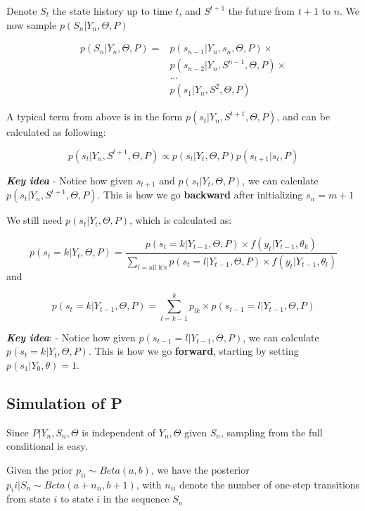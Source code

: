 \documentclass{article}
\begin{document}
Denote $S_t$ the state history up to time $t$, and $S^{t+1}$ the future
from $t+1$ to $n$. We now sample $p(S_n | Y_n, \Theta, P)$

\begin{align}
p(S_n | Y_n, \Theta, P) =
& p(s_{n-1} | Y_n, s_n, \Theta, P) \times \\
& p(s_{n-2} | Y_n, S^{n-1}, \Theta, P) \times  \\
& \dots \\
& p(s_1 | Y_n, S^2, \Theta, P)
\end{align}

A typical term from above is in the form
$p(s_t | Y_n, S^{t+1}, \Theta, P)$, and can be calculated as following:

\begin{equation}
p(s_t | Y_n, S^{t+1}, \Theta, P) \propto p(s_t | Y_t, \Theta, P) p(s_{t+1}|s_t, P)
\end{equation}

\textbf{\emph{Key idea}} - Notice how given $s_{t+1}$ and
$p(s_t | Y_t, \Theta, P)$, we can calculate
$p(s_t | Y_n, S^{t+1}, \Theta, P)$. This is how we go \textbf{backward}
after initializing $s_n = m + 1$

We still need $p(s_t | Y_t, \Theta, P)$, which is calculated as:

\[
p(s_t = k | Y_t, \Theta, P) = \frac{p(s_t = k | Y_{t-1}, \Theta, P) \times f(y_t | Y_{t-1}, \theta_k)}{\sum_{l = \text{all k's}} p(s_t = l | Y_{t-1}, \Theta, P) \times f(y_t | Y_{t-1}, \theta_l)}
\] and

\[
p(s_t = k | Y_{t-1}, \Theta, P) = \sum_{l=k-1}^{k} p_{lk} \times p(s_{t-1} = l |Y_{t-1}, \Theta, P)
\]

\textbf{\emph{Key idea}}: - Notice how given
$p(s_{t-1} = l |Y_{t-1}, \Theta, P)$, we can calculate
$p(s_t = k | Y_t, \Theta, P)$. This is how we go \textbf{forward},
starting by setting $p(s_1 | Y_0, \theta)=1$.

    \subsection{Simulation of P}\label{simulation-of-p}

Since $P | Y_n, S_n, \Theta$ is independent of $Y_n, \Theta$ given
$S_n$, sampling from the full conditional is easy.

Given the prior $p_{ii} \sim Beta(a, b)$, we have the posterior
$p_ii | S_n \sim Beta(a + n_{ii}, b + 1)$, with $n_{ii}$ denote the
number of one-step transitions from state $i$ to state $i$ in the
sequence $S_n$
\end{document}
